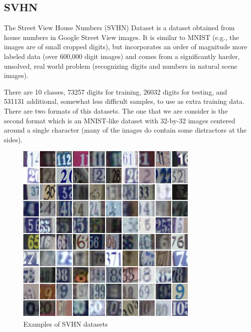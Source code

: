 


\subsection{SVHN}
The Street View House Numbers (SVHN) Dataset \cite{netzer2011reading} is a dataset obtained from house numbers in Google Street View images. It is similar to MNIST (e.g., the images are of small cropped digits), but incorporates an order of magnitude more labeled data (over 600,000 digit images) and comes from a significantly harder, unsolved, real world problem (recognizing digits and numbers in natural scene images).

There are 10 classes, 73257 digits for training, 26032 digits for testing, and 531131 additional, somewhat less difficult samples, to use as extra training data. There are two formats of this datasets. The one that we are consider is the second format which is an MNIST-like dataset with 32-by-32 images centered around a single character (many of the images do contain some distractors at the sides).

\begin{figure}[h]
	\includegraphics[scale=0.5]{figures/svhn}
	\centering
	\caption{Examples of SVHN datasets \cite{netzer2011reading}}
	\label{fig:svhn}
\end{figure}

